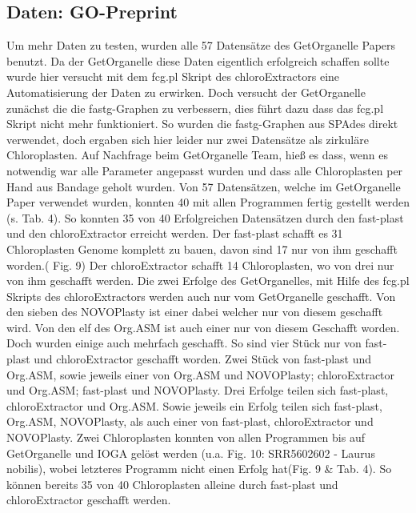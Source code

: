 \documentclass{scrartcl}
\begin{document}
\subsection{Daten: GO-Preprint}
\label{sec-4-4}
Um mehr Daten zu testen, wurden alle 57 Datensätze des GetOrganelle Papers \footnotemark[28]{} benutzt. Da der GetOrganelle diese Daten eigentlich erfolgreich schaffen sollte
wurde hier versucht mit dem fcg.pl Skript des chloroExtractors eine Automatisierung der Daten zu erwirken. Doch versucht der GetOrganelle zunächst die die fastg-Graphen
zu verbessern, dies führt dazu dass das fcg.pl Skript nicht mehr funktioniert. So wurden die fastg-Graphen aus SPAdes direkt verwendet, doch ergaben sich hier leider nur
zwei Datensätze als zirkuläre Chloroplasten. Auf Nachfrage beim GetOrganelle Team, hieß es dass, wenn es notwendig war alle Parameter angepasst wurden und dass alle 
Chloroplasten per Hand aus Bandage geholt wurden. 
Von 57 Datensätzen, welche im GetOrganelle Paper verwendet wurden, konnten 40 mit allen Programmen fertig gestellt werden (s. Tab. 4).
So konnten 35 von 40 Erfolgreichen Datensätzen durch den fast-plast und den chloroExtractor erreicht werden.  Der fast-plast schafft es 31 Chloroplasten Genome komplett
zu bauen, davon sind 17 nur von ihm geschafft worden.( Fig. 9) Der chloroExtractor schafft 14 Chloroplasten, wo von drei nur von ihm geschafft werden. Die zwei Erfolge des GetOrganelles,
mit Hilfe des fcg.pl Skripts des chloroExtractors werden auch nur vom GetOrganelle geschafft. Von den sieben des NOVOPlasty ist einer dabei welcher nur von diesem geschafft wird.
Von den elf des Org.ASM ist auch einer nur von diesem Geschafft worden. Doch wurden einige auch mehrfach geschafft. So sind vier Stück nur von fast-plast und chloroExtractor geschafft worden.
Zwei Stück von fast-plast und Org.ASM, sowie jeweils einer von Org.ASM und NOVOPlasty; chloroExtractor und Org.ASM; fast-plast und NOVOPlasty.
Drei Erfolge teilen sich fast-plast, chloroExtractor und Org.ASM. Sowie jeweils ein Erfolg teilen sich fast-plast, Org.ASM, NOVOPlasty, als auch einer von fast-plast, chloroExtractor und NOVOPlasty.
Zwei Chloroplasten konnten von allen Programmen bis auf GetOrganelle und IOGA gelöst werden (u.a. Fig. 10: SRR5602602 - Laurus nobilis), wobei letzteres Programm nicht einen Erfolg hat(Fig. 9 \& Tab. 4). 
So können bereits 35 von 40 Chloroplasten alleine durch fast-plast und chloroExtractor geschafft werden.
\end{document}
